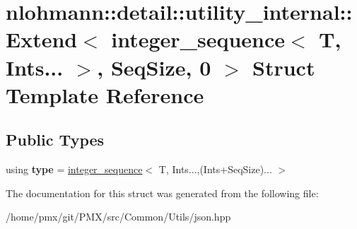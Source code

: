 \hypertarget{structnlohmann_1_1detail_1_1utility__internal_1_1Extend_3_01integer__sequence_3_01T_00_01Ints_8_453fbce128d545e87778192b2e607842}{}\section{nlohmann\+:\+:detail\+:\+:utility\+\_\+internal\+:\+:Extend$<$ integer\+\_\+sequence$<$ T, Ints... $>$, Seq\+Size, 0 $>$ Struct Template Reference}
\label{structnlohmann_1_1detail_1_1utility__internal_1_1Extend_3_01integer__sequence_3_01T_00_01Ints_8_453fbce128d545e87778192b2e607842}
\subsection*{Public Types}
\begin{DoxyCompactItemize}
\item 
\mbox{\label{structnlohmann_1_1detail_1_1utility__internal_1_1Extend_3_01integer__sequence_3_01T_00_01Ints_8_453fbce128d545e87778192b2e607842_a75d2738748868859f358e87d3b89f6fc}} 
using {\bfseries type} = \hyperlink{structnlohmann_1_1detail_1_1integer__sequence}{integer\+\_\+sequence}$<$ T, Ints...,(Ints+Seq\+Size)... $>$
\end{DoxyCompactItemize}


The documentation for this struct was generated from the following file\+:\begin{DoxyCompactItemize}
\item 
/home/pmx/git/\+P\+M\+X/src/\+Common/\+Utils/json.\+hpp\end{DoxyCompactItemize}
